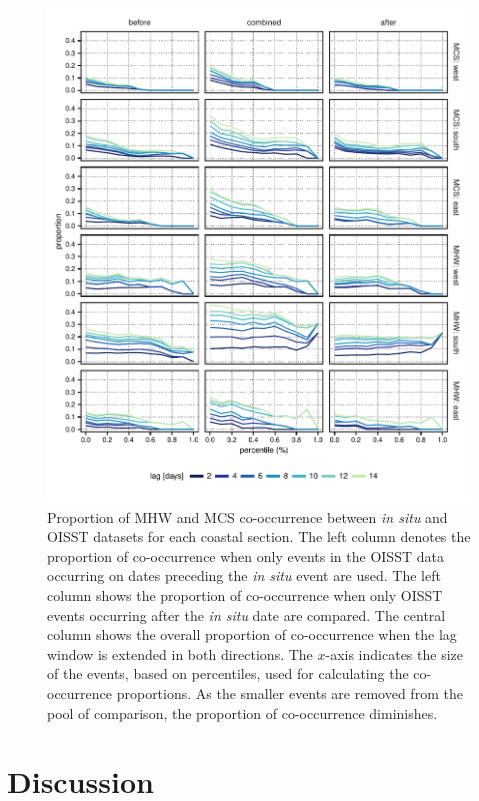 \documentclass[a4paper,10pt,review]{elsarticle}
\begin{document}
\begin{figure}
\centering \includegraphics[width=1.0\textwidth]{figure4.pdf}
\caption{Proportion of MHW and MCS co-occurrence between \emph{in situ} and OISST datasets for each coastal section. The left column denotes the proportion of co-occurrence when only events in the OISST data occurring on dates preceding the \emph{in situ} event are used. The left column shows the proportion of co-occurrence when only OISST events occurring after the \emph{in situ} date are compared. The central column shows the overall proportion of co-occurrence when the lag window is extended in both directions. The $x$-axis indicates the size of the events, based on percentiles, used for calculating the co-occurrence proportions. As the smaller events are removed from the pool of comparison, the proportion of co-occurrence diminishes.} \label{fig:Figure4}
\end{figure}

\section{Discussion}
\end{document}
